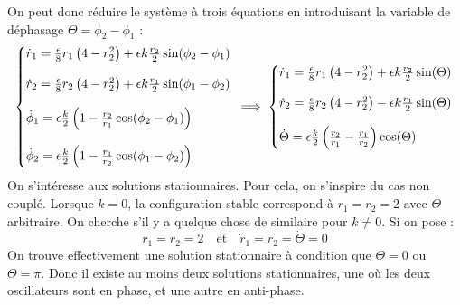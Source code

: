 On peut donc réduire le système à trois équations en introduisant la variable de déphasage $\Theta = \phi_2 - \phi_1$ :
%
\begin{equation}
    \left\{\begin{array}{@{}l@{}}
        \dot{r}_1 =  \frac{\epsilon}{8} r_1 \left( 4 - r_2^2 \right) + \epsilon k\frac{r_2}{2}\sin(\phi_2 - \phi_1)\\
        \\
        \dot{r}_2 =  \frac{\epsilon}{8} r_2 \left( 4 - r_2^2 \right) + \epsilon k\frac{r_1}{2}\sin(\phi_1 - \phi_2)\\
        \\
        \dot{\phi}_1 = \epsilon \frac{k}{2}\left( 1 - \frac{r_2}{r_1}\cos(\phi_2 - \phi_1)\right) \\
        \\
        \dot{\phi}_2 = \epsilon \frac{k}{2}\left( 1 - \frac{r_1}{r_2}\cos(\phi_1 - \phi_2)\right)
    \end{array}\right.\,
    \implies
    \left\{\begin{array}{@{}l@{}}
        \dot{r}_1 = \frac{\epsilon}{8} r_1 \left( 4 - r_2^2 \right) + \epsilon k\frac{r_2}{2}\sin(\Theta)\\
        \\
        \dot{r}_2 = \frac{\epsilon}{8} r_2 \left( 4 - r_2^2 \right) - \epsilon k\frac{r_1}{2}\sin(\Theta) \\
        \\
      \dot{\Theta} = \epsilon \frac{k}{2}\left(  \frac{r_2}{r_1} - \frac{r_1}{r_2} \right)\cos(\Theta)
    \end{array}\right.\,
  \end{equation}
  On s'intéresse aux solutions stationnaires. Pour cela, on s'inspire du cas non couplé. Lorsque $k=0$, la configuration stable correspond à $r_1 = r_2 = 2 $
avec $\Theta$ arbitraire.
%
On cherche s'il y a quelque chose de similaire pour $k \neq 0$. Si on pose :
\[r_1 = r_2 = 2 \quad \text{et} \quad \dot{r}_1 = \dot{r}_2 = \dot{\Theta} = 0\]
On trouve effectivement une solution stationnaire à condition que $\Theta = 0$ ou $\Theta = \pi$. Donc il existe au moins deux solutions stationnaires, une où les deux oscillateurs sont en phase, et une autre en anti-phase.
%
